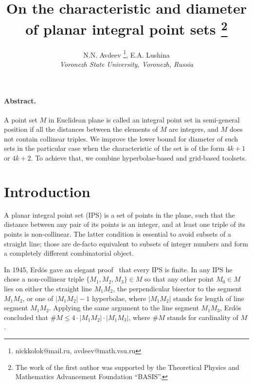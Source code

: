 \documentclass[a4paper,14pt]{article} %
\theoremstyle{plain}
\theoremstyle{definition}
\begin{document}

\title{
	On the characteristic and diameter of planar integral point sets
	\footnote{
		The work of the first author was supported by the Theoretical Physics
		and Mathematics Advancement Foundation “BASIS”.
	}
}

\author{
	N.N. Avdeev
	\footnote{nickkolok@mail.ru, avdeev@math.vsu.ru},
	E.A. Lushina
	\\
	\textit{Voronezh State University, Voronezh, Russia}
}


\maketitle

\paragraph{Abstract.}
A point set $M$ in Euclidean plane is called an integral point set in semi-general position if all the distances between the
elements of $M$ are integers, and $M$ does not contain collinear triples.
We improve the lower bound for diameter of such sets in the particular case
when the characteristic of the set is of the form $4k+1$ or $4k+2$.
To achieve that, we combine hyperbolae-based and grid-based toolsets.


\section{Introduction}
	A planar integral point set (IPS) is a set of points in the plane, such that the distance between any pair of its points is an integer, and at least one triple of its points is non-collinear. The latter condition is essential to avoid subsets of a straight line; those are de-facto equivalent to subsets of integer numbers and form a completely different combinatorial object.

	In 1945, Erdös gave an elegant proof~\cite{anning1945integral,erdos1945integral} that every IPS is finite.
	In any IPS he chose a non-collinear triple $\{M_1, M_2, M_3\} \in M$ so that any other point $M_0 \in M$ lies on either the straight line $M_1M_2$, the perpendicular bisector to the segment $M_1M_2$, or one of $|M_1M_2|-1$ hyperbolae, where $|M_1M_2|$ stands for length of line segment $M_1M_2$.  Applying the same argument to the line segment $M_1M_3$, Erdös concluded that $\#M \le 4 \cdot |M_1M_2| \cdot |M_1M_3|$, where $\#M$ stands for cardinality of $M$.
\end{document}
